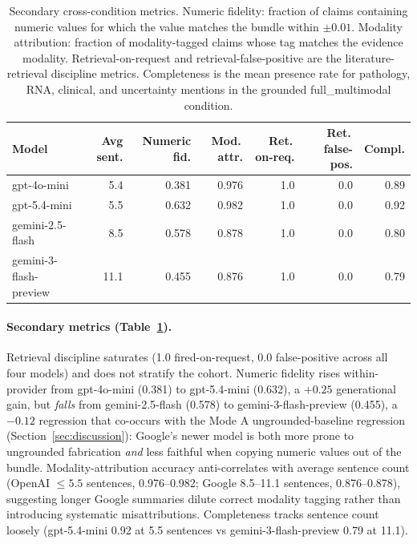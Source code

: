 \documentclass{article}
\theoremstyle{plain}
\begin{document}
\begin{table}[!t]
\centering
\small
\begin{tabular}{lrrrrrr}
\toprule
\textbf{Model} & \textbf{Avg sent.} & \textbf{Numeric fid.} & \textbf{Mod.\,attr.} & \textbf{Ret.\,on-req.} & \textbf{Ret.\,false-pos.} & \textbf{Compl.} \\
\midrule
gpt-4o-mini             & 5.4  & 0.381 & 0.976 & 1.0 & 0.0 & 0.89 \\
gpt-5.4-mini            & 5.5  & 0.632 & 0.982 & 1.0 & 0.0 & 0.92 \\
gemini-2.5-flash        & 8.5  & 0.578 & 0.878 & 1.0 & 0.0 & 0.80 \\
gemini-3-flash-preview  & 11.1 & 0.455 & 0.876 & 1.0 & 0.0 & 0.79 \\
\bottomrule
\end{tabular}
\caption{Secondary cross-condition metrics. Numeric fidelity: fraction of claims containing numeric values for which the value matches the bundle within $\pm 0.01$. Modality attribution: fraction of modality-tagged claims whose tag matches the evidence modality. Retrieval-on-request and retrieval-false-positive are the literature-retrieval discipline metrics. Completeness is the mean presence rate for pathology, RNA, clinical, and uncertainty mentions in the grounded full\_multimodal condition.}
\label{tab:secondary}
\end{table}

\paragraph{Secondary metrics (Table~\ref{tab:secondary}).}
Retrieval discipline saturates (1.0 fired-on-request, 0.0 false-positive across all four models) and does not stratify the cohort. Numeric fidelity rises within-provider from gpt-4o-mini (0.381) to gpt-5.4-mini (0.632), a $+0.25$ generational gain, but \emph{falls} from gemini-2.5-flash (0.578) to gemini-3-flash-preview (0.455), a $-0.12$ regression that co-occurs with the Mode A ungrounded-baseline regression (Section~\ref{sec:discussion}): Google's newer model is both more prone to ungrounded fabrication \emph{and} less faithful when copying numeric values out of the bundle. Modality-attribution accuracy anti-correlates with average sentence count (OpenAI $\leq 5.5$ sentences, 0.976--0.982; Google 8.5--11.1 sentences, 0.876--0.878), suggesting longer Google summaries dilute correct modality tagging rather than introducing systematic misattributions. Completeness tracks sentence count loosely (gpt-5.4-mini 0.92 at 5.5 sentences vs gemini-3-flash-preview 0.79 at 11.1).
\end{document}
